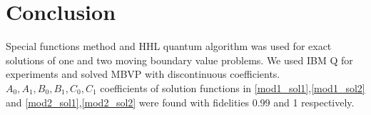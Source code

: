 \documentclass[review]{elsarticle}
\begin{document}
\section{Conclusion}
\label{sec:conclusions}

Special functions method and HHL quantum algorithm was used for exact solutions of one and two moving boundary value problems. We used IBM Q for experiments \cite{SarFirst} and solved MBVP with discontinuous coefficients. $A_0,A_1, B_0,B_1,C_0, C_1$ coefficients of solution functions in \ref{mod1_sol1},\ref{mod1_sol2} and \ref{mod2_sol1},\ref{mod2_sol2} were found with fidelities 0.99 and 1 respectively.







\end{document}
